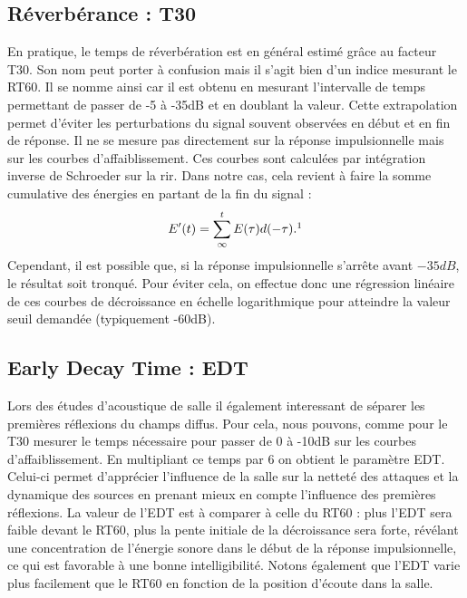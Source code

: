 \subsection{Réverbérance : \gls{T30}}
En pratique, le temps de réverbération est en général estimé grâce au facteur \gls{T30}. Son nom peut porter à confusion mais il s'agit bien d'un indice mesurant le \gls{RT60}. Il se nomme ainsi car il est obtenu en mesurant l’intervalle de temps permettant de passer de -5 à -35dB et en doublant la valeur. Cette extrapolation permet d’éviter les perturbations du signal souvent observées en début et en fin de réponse. Il ne se mesure pas directement sur la réponse impulsionnelle mais sur les courbes d'affaiblissement. Ces courbes sont calculées par intégration inverse de Schroeder \cite[p.410]{schroeder} sur la \gls{rir}. Dans notre cas, cela revient à faire la somme cumulative des énergies en partant de la fin du signal :
\begin{equation}
E'(t)=\sum_\infty^t E(\tau)d(-\tau). \footnotemark
\end{equation}
 Cependant, il est possible que, si la réponse impulsionnelle s'arrête avant $-35dB$, le résultat soit tronqué. Pour éviter cela, on effectue donc une régression linéaire de ces courbes de décroissance en échelle logarithmique pour atteindre la valeur seuil demandée (typiquement -60dB).


\subsection{Early Decay Time : \gls{EDT}}
Lors des études d'acoustique de salle il également interessant de séparer les premières réflexions du champs diffus. Pour cela, nous pouvons, comme pour le \gls{T30} mesurer le temps nécessaire pour passer de 0 à -10dB sur les courbes d'affaiblissement. En multipliant ce temps par 6 on obtient le paramètre \gls{EDT}. Celui-ci permet d’apprécier l’influence de la salle sur la netteté des attaques et la dynamique des sources en prenant mieux en compte  l’influence  des  premières  réflexions.  La  valeur  de  l’\gls{EDT}  est  à  comparer  à  celle  du \gls{RT60} : plus l’EDT sera faible devant le \gls{RT60}, plus la pente initiale de la décroissance sera forte, révélant  une  concentration  de  l’énergie  sonore  dans  le  début  de  la  réponse  impulsionnelle, ce qui est  favorable  à  une  bonne  intelligibilité.  Notons  également  que  l’\gls{EDT}  varie  plus  facilement  que  le  \gls{RT60} en fonction de la position d’écoute dans la salle.  

